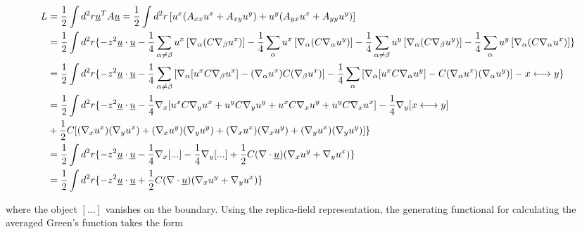 \documentclass[twoside,twocolumn,9pt]{article}
\begin{document}
\begin{strip}
\begin{align}
L&=\frac{1}{2}\int d^2r\underline{u}^TA\underline{u}=\frac{1}{2}\int d^2r\left[u^x(A_{xx}u^x+A_{xy}u^y)+u^y(A_{yx}u^x+A_{yy}u^y)\right]\notag\\
&=\frac{1}{2}\int d^2r\{-z^2\underline{u}\cdot\underline{u}-\frac{1}{4}\sum_{\alpha\neq\beta}u^x\left[\nabla_\alpha(C\nabla_\beta u^x)\right]-\frac{1}{4}\sum_\alpha u^x\left[\nabla_\alpha(C\nabla_\alpha u^y)\right]-\frac{1}{4}\sum_{\alpha\neq \beta}u^y\left[\nabla_\alpha(C\nabla_\beta u^y)\right]-\frac{1}{4}\sum_\alpha u^y\left[\nabla_\alpha(C\nabla_\alpha u^x)\right]\}\notag\\
&=\frac{1}{2}\int d^2r\{-z^2\underline{u}\cdot\underline{u}-\frac{1}{4}\sum_{\alpha\neq\beta}\left[\nabla_\alpha[u^xC\nabla_\beta u^x]-(\nabla_\alpha u^x)C(\nabla_\beta u^x)\right]-\frac{1}{4}\sum_\alpha\left[\nabla_\alpha[u^xC\nabla_\alpha u^y]-C(\nabla_\alpha u^x)(\nabla_\alpha u^y)\right]-x\longleftrightarrow y\}\notag\\
&=\frac{1}{2}\int d^2r\{-z^2\underline{u}\cdot\underline{u}-\frac{1}{4}\nabla_x[u^xC\nabla_yu^x+u^yC\nabla_yu^y+u^xC\nabla_xu^y+u^yC\nabla_xu^x]-\frac{1}{4}\nabla_y[x\longleftrightarrow y]\notag\\
&+\frac{1}{2}C[(\nabla_xu^x)(\nabla_yu^x)+(\nabla_xu^y)(\nabla_yu^y)+(\nabla_xu^x)(\nabla_xu^y)+(\nabla_yu^x)(\nabla_yu^y)]\}\notag\\
&=\frac{1}{2}\int d^2r\{-z^2\underline{u}\cdot\underline{u}-\frac{1}{4}\nabla_x[...]-\frac{1}{4}\nabla_y[...]+\frac{1}{2}C(\nabla\cdot\underline{u})(\nabla_xu^y+\nabla_yu^x)\}\notag\\
&=\frac{1}{2}\int d^2r\{-z^2\underline{u}\cdot\underline{u}+\frac{1}{2}C(\nabla\cdot\underline{u})(\nabla_xu^y+\nabla_yu^x)\}
\end{align}
\end{strip}
where the object $[...]$ vanishes on the boundary.
Using the replica-field representation, the generating functional for calculating the averaged Green's function takes the form
\end{document}
